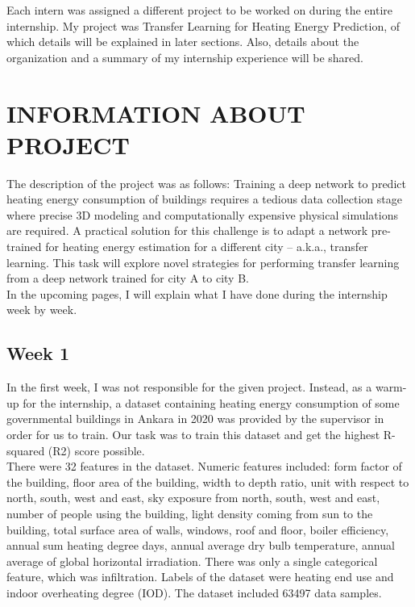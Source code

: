 \documentclass{article}
\begin{document}
Each intern was assigned a different project to be worked on during the entire internship. My project was Transfer Learning for Heating Energy Prediction, of which details will be explained in later sections. Also, details about the organization and a summary of my internship experience will be shared.

\newpage

\section{INFORMATION ABOUT PROJECT}
\hspace{0.5cm}
The description of the project was as follows: Training a deep network to predict heating energy consumption of buildings requires a tedious data collection stage where precise 3D modeling and computationally expensive physical simulations are required. A practical solution for this challenge is to adapt a network pre-trained for heating energy estimation for a different city -- a.k.a., transfer learning. This task will explore novel strategies for performing transfer learning from a deep network trained for city A to city B.\\

In the upcoming pages, I will explain what I have done during the internship week by week.

\subsection{Week 1}
\hspace{0.5cm}
In the first week, I was not responsible for the given project. Instead, as a warm-up for the internship, a dataset containing heating energy consumption of some governmental buildings in Ankara in 2020 was provided by the supervisor in order for us to train. Our task was to train this dataset and get the highest R-squared (R2) score possible.\\

There were 32 features in the dataset. Numeric features included: form factor of the building, floor area of the building, width to depth ratio, unit with respect to north, south, west and east, sky exposure from north, south, west and east, number of people using the building, light density coming from sun to the building, total surface area of walls, windows, roof and floor, boiler efficiency, annual sum heating degree days, annual average dry bulb temperature, annual average of global horizontal irradiation. There was only a single categorical feature, which was infiltration. Labels of the dataset were heating end use and indoor overheating degree (IOD). The dataset included 63497 data samples.\\
\end{document}
